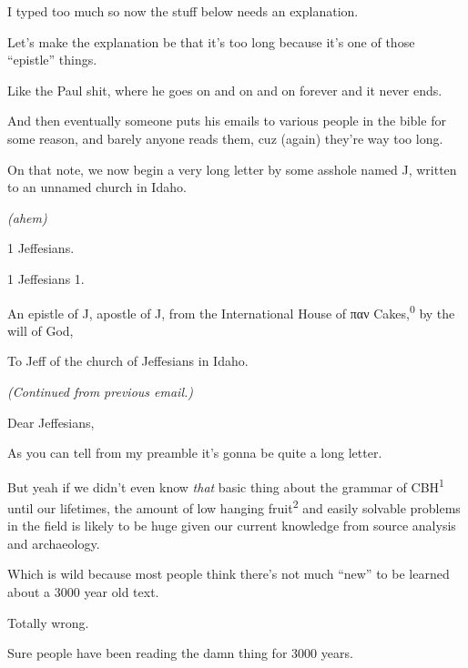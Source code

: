 
I typed too much so now the stuff below needs an explanation.

Let's make the explanation be that it's too long because it's one of those ``epistle'' things.

Like the Paul shit, where he goes on and on and on forever and it never ends.

And then eventually someone puts his emails to various people in the bible for some reason, and barely anyone reads them, cuz (again) they're way too long.

On that note, we now begin a very long letter by some asshole named J, written to an unnamed church in Idaho.

\par\medskip\VerseRule\medskip

\emph{(ahem)}

\par\medskip\VerseRule\medskip

1 Jeffesians.

\par\medskip\VerseRule\medskip

1 Jeffesians 1.

An epistle of J, apostle of J, from the International House of παν Cakes,\textsuperscript{0} by the will of God,

To Jeff of the church of Jeffesians in Idaho.

\emph{(Continued from previous email.)}

\par\medskip\VerseRule\medskip

Dear Jeffesians,

As you can tell from my preamble it's gonna be quite a long letter.

\par\medskip\VerseRule\medskip

But yeah if we didn't even know \emph{that} basic thing about the grammar of CBH\textsuperscript{1} until our lifetimes, the amount of low hanging fruit\textsuperscript{2} and easily solvable problems in the field is likely to be huge given our current knowledge from source analysis and archaeology.

Which is wild because most people think there's not much ``new'' to be learned about a 3000 year old text.

Totally wrong.

Sure people have been reading the damn thing for 3000 years.

